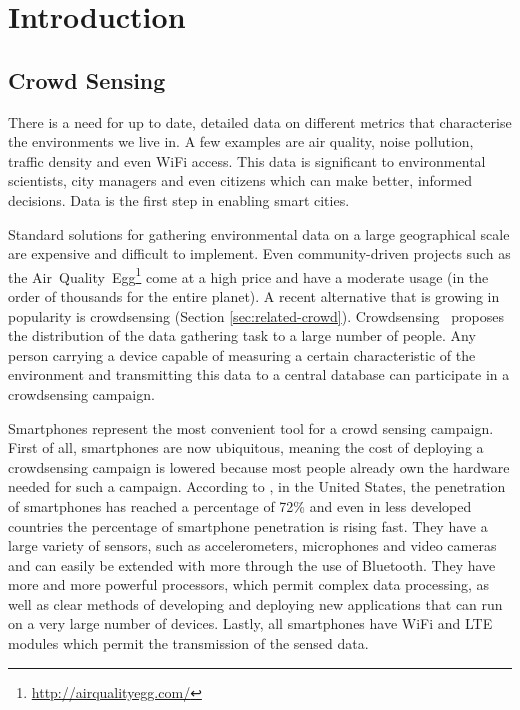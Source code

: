 \chapter{Introduction}
\label{chapter:intro}

\section{Crowd Sensing}
\label{sec:intro-crowd}
There is a need for up to date, detailed data on different metrics that characterise the environments we live in. A few examples are air quality, noise pollution, traffic density and even WiFi access. This data is significant to environmental scientists, city managers and even citizens which can make better, informed decisions. Data is the first step in enabling smart cities.

Standard solutions for gathering environmental data on a large geographical scale are expensive and difficult to implement. Even community-driven projects such as the Air~Quality~Egg\footnote{\url{http://airqualityegg.com/}} come at a high price and have a moderate usage (in the order of thousands for the entire planet). A recent alternative that is growing in popularity is crowdsensing (Section \ref{sec:related-crowd}). Crowdsensing~\cite{riva2007urbanet} proposes the distribution of the data gathering task to a large number of people. Any person carrying a device capable of measuring a certain characteristic of the environment and transmitting this data to a central database can participate in a crowdsensing campaign.

Smartphones represent the most convenient tool for a crowd sensing campaign. First of all, smartphones are now ubiquitous, meaning the cost of deploying a crowdsensing campaign is lowered because most people already own the hardware needed for such a campaign. According to \cite{poushter2016smartphone}, in the United States, the penetration of smartphones has reached a percentage of 72\% and even in less developed countries the percentage of smartphone penetration is rising fast. They have a large variety of sensors, such as accelerometers, microphones and video cameras and can easily be extended with more through the use of Bluetooth. They have more and more powerful processors, which permit complex data processing, as well as clear methods of developing and deploying new applications that can run on a very large number of devices. Lastly, all smartphones have WiFi and LTE modules which permit the transmission of the sensed data.

